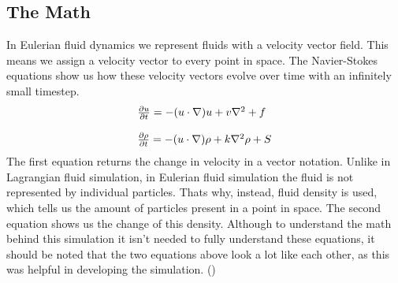 \documentclass[a4paper,12pt]{article}
\begin{document}
\subsection{The Math} \label{math}
In Eulerian fluid dynamics we represent fluids with a velocity vector field. This means we assign a velocity vector to every point in space.
The Navier-Stokes equations show us how these velocity vectors evolve over time with an infinitely small timestep.
\[
	\begin{array}{ll}
		\pdv{u}{t} = -(u \cdot \nabla)u + v\nabla^2 + f \\
		\\
		\pdv{\rho}{t} = -(u \cdot \nabla)\rho + k\nabla^2\rho + S
	\end{array}
\]
The first equation returns the change in velocity in a vector notation. 
Unlike in Lagrangian fluid simulation, in Eulerian fluid simulation the fluid is not represented by individual particles. 
Thats why, instead, fluid density is used, which tells us the amount of particles present in a point in space. 
The second equation shows us the change of this density. 
Although to understand the math behind this simulation it isn't needed to fully understand these equations, it should be noted that the two equations above look a lot like each other,
as this was helpful in developing the simulation. (\cite{josstam})
\end{document}
